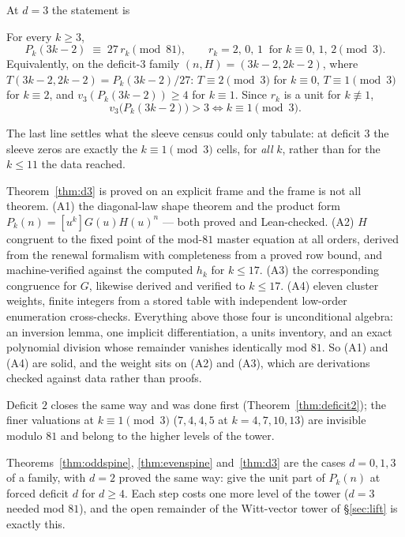 \documentclass[11pt]{article}
\newcommand{\vthree}{v_3}
\begin{document}
At $d = 3$ the statement is
\begin{theorem}
\label{thm:d3}
For every $k \ge 3$,
\[
  P_k(3k-2) \;\equiv\; 27\,r_k \pmod{81},
  \qquad r_k = 2,\,0,\,1 \ \text{ for } k \equiv 0,\,1,\,2 \pmod 3 .
\]
Equivalently, on the deficit-$3$ family $(n,H) = (3k-2, 2k-2)$, where
$T(3k-2,2k-2) = P_k(3k-2)/27$: $T \equiv 2 \pmod 3$ for $k \equiv 0$,
$T \equiv 1 \pmod 3$ for $k \equiv 2$, and $\vthree(P_k(3k-2)) \ge 4$ for
$k \equiv 1$. Since $r_k$ is a unit for $k \not\equiv 1$,
\[
  \vthree\bigl(P_k(3k-2)\bigr) > 3 \iff k \equiv 1 \pmod 3 .
\]
\end{theorem}

The last line settles what the sleeve census could only tabulate: at deficit $3$
the sleeve zeros are exactly the $k \equiv 1 \pmod 3$ cells, for \emph{all} $k$,
rather than for the $k \le 11$ the data reached.

\begin{remark}
Theorem~\ref{thm:d3} is proved on an explicit frame and the frame is not all
theorem. (A1) the diagonal-law shape theorem and the product form
$P_k(n) = [u^k]G(u)H(u)^n$ --- both proved and Lean-checked. (A2) $H$ congruent
to the fixed point of the mod-$81$ master equation at all orders, derived from
the renewal formalism with completeness from a proved row bound, and
machine-verified against the computed $h_k$ for $k \le 17$. (A3) the corresponding
congruence for $G$, likewise derived and verified to $k \le 17$. (A4) eleven
cluster weights, finite integers from a stored table with independent low-order
enumeration cross-checks. Everything above those four is unconditional algebra:
an inversion lemma, one implicit differentiation, a units inventory, and an exact
polynomial division whose remainder vanishes identically mod $81$. So (A1) and
(A4) are solid, and the weight sits on (A2) and (A3), which are derivations
checked against data rather than proofs.
\end{remark}

Deficit $2$ closes the same way and was done first
(Theorem~\ref{thm:deficit2}); the finer valuations at
$k \equiv 1 \pmod 3$ ($7, 4, 4, 5$ at $k = 4, 7, 10, 13$) are invisible
modulo $81$ and belong to the higher levels of the tower.

\begin{openproblem}
Theorems~\ref{thm:oddspine}, \ref{thm:evenspine} and~\ref{thm:d3} are the cases
$d = 0, 1, 3$ of a family, with $d = 2$ proved the same way: give the unit part
of $P_k(n)$ at forced deficit $d$ for $d \ge 4$. Each step costs one more level
of the tower ($d = 3$ needed mod $81$), and the open remainder of the
Witt-vector tower of \S\ref{sec:lift} is exactly this.
\end{openproblem}
\end{document}
